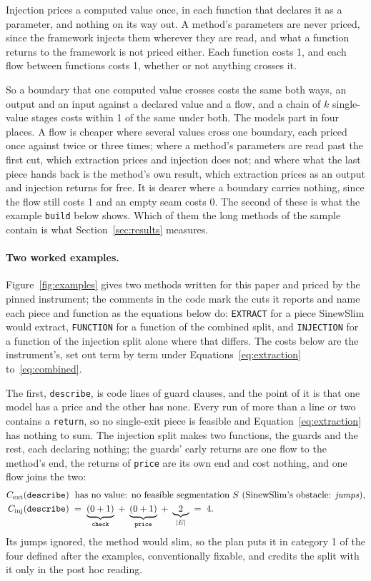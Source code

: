 \documentclass[11pt,a4paper]{article}
\newcommand{\sig}[1]{\texttt{#1}}
\begin{document}
Injection prices a computed value once, in each function that declares it
as a parameter, and nothing on its way out. A method's parameters are never
priced, since the framework injects them wherever they are read, and what a
function returns to the framework is not priced either. Each function costs
1, and each flow between functions costs 1, whether or not anything crosses
it.

So a boundary that one computed value crosses costs the same both ways, an
output and an input against a declared value and a flow, and a chain of $k$
single-value stages costs within 1 of the same under both. The models part
in four places. A flow is cheaper where several values cross one boundary,
each priced once against twice or three times; where a method's parameters
are read past the first cut, which extraction prices and injection does not;
and where what the last piece hands back is the method's own result, which
extraction prices as an output and injection returns for free. It is dearer
where a boundary carries nothing, since the flow still costs 1 and an empty
seam costs 0. The second of these is what the example \sig{build} below
shows. Which of them the long methods of the sample contain is what
Section~\ref{sec:results} measures.

\paragraph{Two worked examples.} Figure~\ref{fig:examples} gives two methods
written for this paper and priced by the pinned instrument; the comments in
the code mark the cuts it reports and name each piece and function as the
equations below do: \sig{EXTRACT} for a piece SinewSlim would extract,
\sig{FUNCTION} for a function of the combined split, and \sig{INJECTION}
for a function of the injection split alone where that differs. The costs
below are the instrument's, set out term by term under
Equations~\eqref{eq:extraction} to~\eqref{eq:combined}.

The first, \sig{describe}, is \exaLines{} code lines of guard clauses, and
the point of it is that one model has a price and the other has none. Every
run of more than a line or two contains a \sig{return}, so no single-exit
piece is feasible and Equation~\eqref{eq:extraction} has nothing to sum.
The injection split makes two functions, the guards and the rest, each
declaring nothing; the guards' early returns are one flow to the method's
end, the returns of \sig{price} are its own end and cost nothing, and one
flow joins the two:
\begin{align*}
  C_{\mathrm{ext}}(\sig{describe}) &\;\text{ has no value: no feasible segmentation } S
    \text{ (SinewSlim's obstacle: \emph{\exaSinewObstacle}),}\\
  C_{\mathrm{inj}}(\sig{describe}) &\;=\;
    \underbrace{(\exaInjFunOneDeclares{} + 1)}_{\sig{check}} \;+\;
    \underbrace{(\exaInjFunTwoDeclares{} + 1)}_{\sig{price}} \;+\;
    \underbrace{\exaInjEdges{}}_{|E|} \;=\; \exaInjTotal{}.
\end{align*}
Its jumps ignored, the method would slim, so the plan puts it in category 1
of the four defined after the examples, conventionally fixable, and credits the split with it only in the
post hoc reading.
\end{document}
